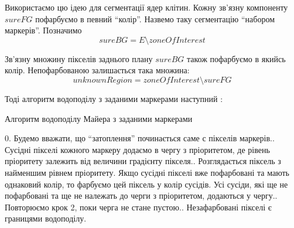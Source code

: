 Використаємо цю ідею для сегментації ядер клітин. Кожну зв'язну компоненту \(sureFG\) пофарбуємо в певний \enquote{колір}. Назвемо таку сегментацію \enquote{набором маркерів}. Позначимо
\begin{equation*}
sureBG = E \setminus zoneOfInterest
\end{equation*}

Зв'язну множину пікселів заднього плану \(sureBG\) також пофарбуємо в якийсь колір. Непофарбованою залишається така множина:
\begin{equation*}
unknownRegion = zoneOfInterest \setminus sureFG
\end{equation*}

Тоді алгоритм водоподілу з заданими маркерами наступний \citep{bib:watershed}:

\begin{megaalgorithm}[H]
	\caption{Алгоритм водоподілу Майера з заданими маркерами}
	
	\BlankLine 
	
	0. Будемо вважати, що \enquote{затоплення} починається саме с пікселів маркерів.. Сусідні пікселі кожного маркеру додаємо в чергу з пріоритетом, де рівень пріоритету залежить від величини градієнту пікселя.. Розглядається піксель з найменшим рівнем пріоритету. Якщо сусідні пікселі вже пофарбовані та мають однаковий колір, то фарбуємо цей піксель у колір сусідів. Усі сусіди, які ще не пофарбовані та ще не належать до черги з пріоритетом, додаються у чергу.. Повторюємо крок 2, поки черга не стане пустою.. Незафарбовані пікселі є границями водоподілу.\;
\end{megaalgorithm}

